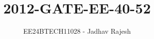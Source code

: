 \documentclass[journal]{IEEEtran}
\begin{document}

\vspace{3cm}
\title{2012-GATE-EE-40-52}
\author{EE24BTECH11028 - Jadhav Rajesh}
{\let\newpage\relax\maketitle}

\renewcommand{\thefigure}{\theenumi}
\renewcommand{\thetable}{\theenumi}
\setlength{\intextsep}{10pt} %


\renewcommand{\thetable}{\theenumi}
\end{document}
